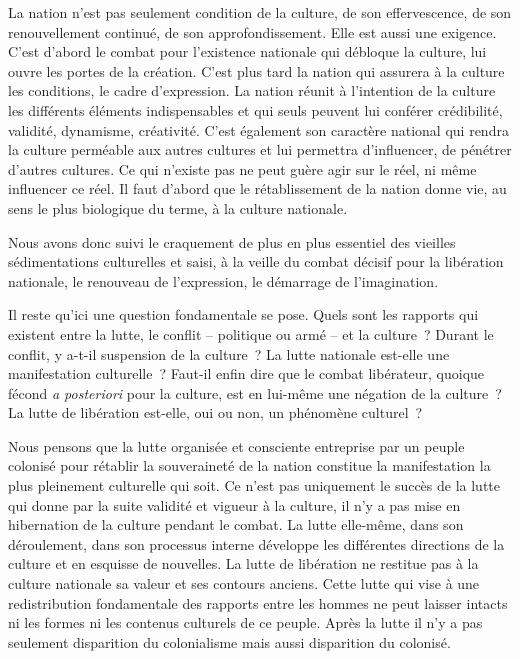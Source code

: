 \documentclass[french,twoside]{book} %
\begin{document}
\noindent La nation n’est pas seulement condition de la culture, de son effervescence, de son renouvellement continué, de son approfondissement. Elle est aussi une exigence. C’est d’abord le combat pour l’existence nationale qui débloque la culture, lui ouvre les portes de la création. C’est plus tard la nation qui assurera à la culture les conditions, le cadre d’expression. La nation réunit à l’intention de la culture les différents éléments indispensables et qui seuls peuvent lui conférer crédibilité,   validité, dynamisme, créativité. C’est également son caractère national qui rendra la culture perméable aux autres cultures et lui permettra d’influencer, de pénétrer d’autres cultures. Ce qui n’existe pas ne peut guère agir sur le réel, ni même influencer ce réel. Il faut d’abord que le rétablissement de la nation donne vie, au sens le plus biologique du terme, à la culture nationale.\par
\bigbreak
\noindent Nous avons donc suivi le craquement de plus en plus essentiel des vieilles sédimentations culturelles et saisi, à la veille du combat décisif pour la libération nationale, le renouveau de l’expression, le démarrage de l’imagination.\par
\bigbreak
\noindent Il reste qu’ici une question fondamentale se pose. Quels sont les rapports qui existent entre la lutte, le conflit – politique ou armé – et la culture ? Durant le conflit, y a-t-il suspension de la culture ? La lutte nationale est-elle une manifestation culturelle ? Faut-il enfin dire que le combat libérateur, quoique fécond \emph{a posteriori} pour la culture, est en lui-même une négation de la culture ? La lutte de libération est-elle, oui ou non, un phénomène culturel ?\par
\bigbreak
\noindent Nous pensons que la lutte organisée et consciente entreprise par un peuple colonisé pour rétablir la souveraineté de la nation constitue la manifestation la plus pleinement culturelle qui soit. Ce n’est pas uniquement le succès de la lutte qui donne par la suite validité et vigueur à la culture, il n’y a pas mise en hibernation de la culture pendant le combat. La lutte elle-même, dans son déroulement, dans son processus interne développe les différentes directions de la culture et en esquisse de nouvelles. La lutte de libération ne restitue pas à la culture nationale sa valeur et ses contours anciens. Cette lutte qui vise à une redistribution fondamentale des rapports entre les hommes ne peut laisser intacts ni les formes ni les contenus culturels de ce peuple. Après la lutte il n’y a pas seulement disparition du colonialisme mais aussi disparition du colonisé.\par
\end{document}
